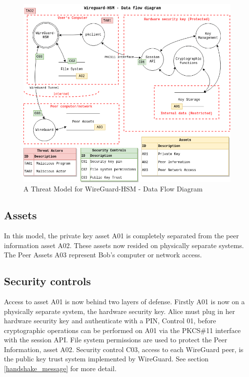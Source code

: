 \documentclass [11pt, proquest] {uwthesis}[2020/02/24]
\begin{document}
\begin{figure}[ht]
\includegraphics[width=14cm]{paper/images/WGHSM__NoPin_DFD.drawio}
\caption{A Threat Model for WireGuard-HSM - Data Flow Diagram}
\label{fig:wg_hsm_dfd}
\end{figure}

\subsection{Assets}
In this model, the private key asset A01 is completely separated from the peer information asset A02. These assets now resided on physically separate systems. The Peer Assets A03 represent Bob's computer or network access.

\subsection{Security controls}
Access to asset A01 is now behind two layers of defense. Firstly A01 is now on a physically separate system, the hardware security key. Alice must plug in her hardware security key and authenticate with a PIN, Control 01, before cryptographic operations can be performed on A01 via the PKCS\#11 interface with the session API.
File system permissions are used to protect the Peer Information, asset A02.
Security control C03, access to each WireGuard peer, is the public key trust system implemented by WireGuard. See section \ref{handshake_message} for more detail.
\end{document}
